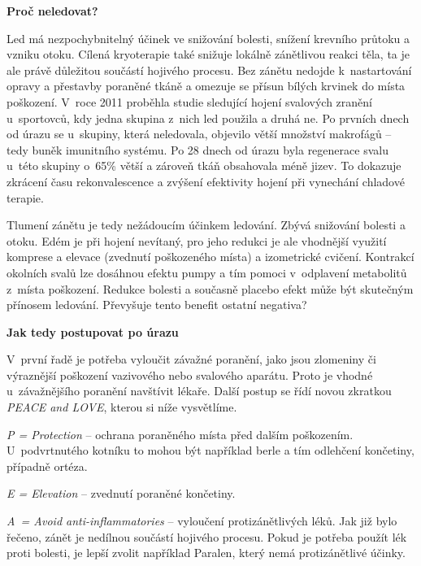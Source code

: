 \documentclass[11pt]{article}
\begin{document}
\begin{center}
  \textbf{Proč neledovat?}
\end{center}

Led má nezpochybnitelný účinek ve snižování bolesti, snížení krevního průtoku a vzniku otoku. Cílená kryoterapie také snižuje lokálně zánětlivou reakci těla, ta je ale právě důležitou součástí hojivého procesu. Bez zánětu nedojde k~nastartování  opravy a přestavby poraněné tkáně a omezuje se přísun bílých krvinek do místa poškození. V~roce 2011 proběhla studie sledující hojení svalových zranění u~sportovců, kdy jedna skupina z~nich led použila a druhá ne. Po prvních dnech od úrazu se u~skupiny, která neledovala, objevilo větší množství makrofágů – tedy buněk imunitního systému. Po 28 dnech od úrazu byla regenerace svalu u~této skupiny o~65\% větší a zároveň tkáň obsahovala méně jizev. To dokazuje zkrácení času rekonvalescence a zvýšení efektivity hojení při vynechání chladové terapie.

Tlumení zánětu je tedy nežádoucím účinkem ledování. Zbývá snižování bolesti a otoku. Edém je při hojení nevítaný, pro jeho redukci je ale vhodnější využití komprese a elevace (zvednutí poškozeného místa) a izometrické cvičení. Kontrakcí okolních svalů lze dosáhnou efektu pumpy a tím pomoci v~odplavení metabolitů z~místa poškození. Redukce bolesti a současně placebo efekt může být skutečným přínosem ledování. Převyšuje tento benefit ostatní negativa? 


\begin{center}
  \textbf{Jak tedy postupovat po úrazu}
\end{center}

V~první řadě je potřeba vyloučit závažné poranění, jako jsou zlomeniny či výraznější poškození vazivového nebo svalového aparátu. Proto je vhodné u~závažnějšího poranění navštívit lékaře. Další postup se řídí novou zkratkou \textit{PEACE and LOVE}, kterou si níže vysvětlíme.

\vspace*{6pt}

\textit{P = Protection} – ochrana poraněného místa před dalším poškozením. U~podvrtnutého kotníku to mohou být například berle a tím odlehčení končetiny, případně ortéza.

\textit{E = Elevation} – zvednutí poraněné končetiny.

\textit{A~= Avoid anti-inflammatories} – vyloučení protizánětlivých léků. Jak již bylo řečeno, zánět je nedílnou součástí hojivého procesu. Pokud je potřeba použít lék proti bolesti, je lepší zvolit například Paralen, který nemá protizánětlivé účinky.
\end{document}
